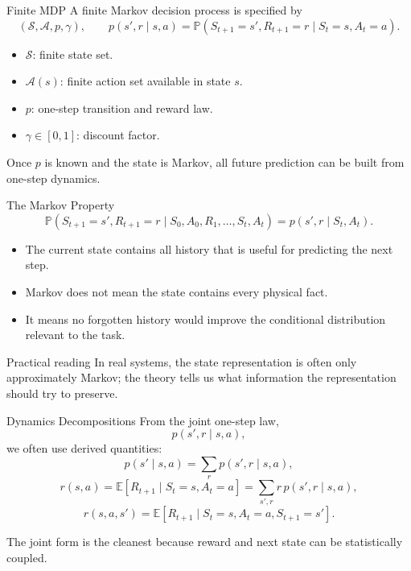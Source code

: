 \documentclass[aspectratio=169]{beamer}
\newcommand{\EE}{\mathbb{E}}
\newcommand{\PP}{\mathbb{P}}
\newcommand{\Sspace}{\mathcal{S}}
\newcommand{\Aspace}{\mathcal{A}}
\begin{document}
\begin{frame}{Finite MDP}
\small
A finite Markov decision process is specified by
\[
(\Sspace,\Aspace,p,\gamma),
\qquad
p(s',r\mid s,a)=\PP(S_{t+1}=s',R_{t+1}=r\mid S_t=s,A_t=a).
\]

\begin{itemize}
    \item $\Sspace$: finite state set.
    \item $\Aspace(s)$: finite action set available in state $s$.
    \item $p$: one-step transition and reward law.
    \item $\gamma\in[0,1]$: discount factor.
\end{itemize}

\vspace{0.5em}
Once $p$ is known and the state is Markov, all future prediction can be built from one-step dynamics.
\end{frame}

\begin{frame}{The Markov Property}
\small
\[
\PP(S_{t+1}=s',R_{t+1}=r \mid S_0,A_0,R_1,\ldots,S_t,A_t)
=p(s',r\mid S_t,A_t).
\]

\vspace{0.7em}
\begin{itemize}
    \item The current state contains all history that is useful for predicting the next step.
    \item Markov does not mean the state contains every physical fact.
    \item It means no forgotten history would improve the conditional distribution relevant to the task.
\end{itemize}

\vspace{0.7em}
\begin{block}{Practical reading}
In real systems, the state representation is often only approximately Markov; the theory tells us what information the representation should try to preserve.
\end{block}
\end{frame}

\begin{frame}{Dynamics Decompositions}
\small
From the joint one-step law,
\[
p(s',r\mid s,a),
\]
we often use derived quantities:
\[
p(s'\mid s,a)=\sum_r p(s',r\mid s,a),
\]
\[
r(s,a)=\EE[R_{t+1}\mid S_t=s,A_t=a]
      =\sum_{s',r} r\,p(s',r\mid s,a),
\]
\[
r(s,a,s')=\EE[R_{t+1}\mid S_t=s,A_t=a,S_{t+1}=s'].
\]

The joint form is the cleanest because reward and next state can be statistically coupled.
\end{frame}
\end{document}
